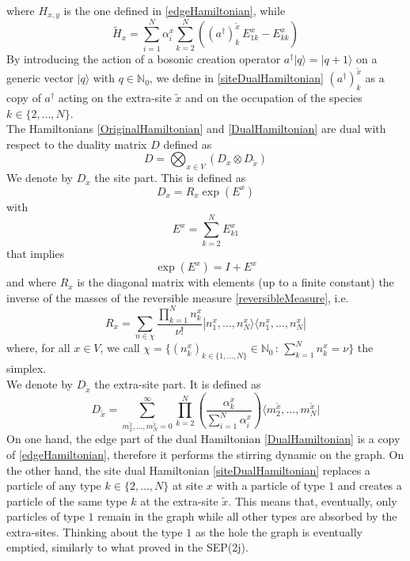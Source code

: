 \documentclass[11pt]{article}
\numberwithin{equation}{section}
\numberwithin{equation}{subsection}
\begin{document}
where $H_{x,y}$ is the one defined in \eqref{edgeHamiltonian}, while 
\begin{equation}\label{siteDualHamiltonian}
    \widetilde{H}_{x}=\sum_{i=1}^{N}\alpha_{i}^{x}\sum_{k=2}^{N}\left((a^{\dagger})_{k}^{\widetilde{x}}\,E_{1k}^{x}-E_{kk}^{x}\right)
\end{equation}
By introducing the action of a bosonic creation operator $a^{\dagger}|q\rangle=|q+1\rangle$ on a generic vector $|q\rangle$ with $q\in \mathbb{N}_{0}$, we define in \eqref{siteDualHamiltonian} 
$(a^{\dagger})_{k}^{\widetilde{x}}$ as a copy of $a^{\dagger}$ acting on the extra-site $\widetilde{x}$ and on the occupation of the species $k\in\{2,\ldots,N\}$. \\
The Hamiltonians \eqref{OriginalHamiltonian} and \eqref{DualHamiltonian} are dual with respect to the duality matrix $D$ defined as 
\begin{equation}
    D=\bigotimes_{x\in V}\left(D_{x}\otimes D_{\widetilde{x}}\right)
\end{equation}
We denote by $D_{x}$ the site part. This is defined as 
\begin{equation}
    D_{x}=R_{x}\exp{(E^{x})}
\end{equation}
with 
\begin{equation}
    E^{x}=\sum_{k=2}^{N}E_{k1}^{x}
\end{equation}
that implies 
\begin{equation}
    \exp{(E^{x})}=I+E^{x}
\end{equation}
and where $R_{x}$ is the diagonal matrix with elements (up to a finite constant) the inverse of the masses of the reversible measure \eqref{reversibleMeasure}, i.e. 
\begin{equation}
    R_{x}=\sum_{n\in\chi}\frac{\prod_{k=1}^{N}n_{k}^{x}}{\nu!}|n_{1}^{x},\ldots,n_{N}^{x}\rangle\langle n_{1}^{x},\ldots,n_{N}^{x}|
\end{equation}
where, for all $x\in V$, we call $\chi=\{(n_{k}^{x})_{k\in\{1,\ldots,N\}}\in \mathbb{N}_{0}\,:\, \sum_{k=1}^{N}n_{k}^{x}=\nu\}$ the simplex.\\ 
We denote by $D_{\widetilde{x}}$ the extra-site part. It is defined as
\begin{equation}\label{dualityMatrix}
D_{\widetilde{x}}=\sum_{m_{2}^{\widetilde{x}},\ldots,m_{N}^{\widetilde{x}}=0}^{\infty}\prod_{k=2}^{N}\left(\frac{\alpha_{k}^{x}}{\sum_{i=1}^{N}\alpha_{i}^{x}}\right)\langle m_{2}^{\widetilde{x}},\ldots,m_{N}^{\widetilde{x}}|
\end{equation}
On one hand, the edge part of the dual Hamiltonian \eqref{DualHamiltonian} is a copy of \eqref{edgeHamiltonian}, therefore it performs the stirring dynamic on the graph. On the other hand, the site dual Hamiltonian \eqref{siteDualHamiltonian} replaces a particle of any type $k\in\{2,\ldots,N\}$ at site $x$ with a particle of type $1$ and creates a particle of the same type $k$ at the extra-site $\widetilde{x}$. This means that, eventually, only particles of type $1$ remain in the graph while all other types are absorbed by the extra-sites. Thinking about the type $1$ as the hole  the graph is eventually emptied, similarly to what proved in the SEP(2j)\cite{carinci2013duality}.
\end{document}
